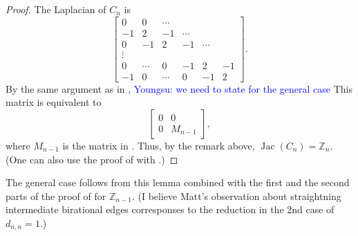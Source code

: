 \documentclass[11pt,reqno]{amsart}
\DeclareMathOperator{\Pic}{Pic}
\DeclareMathOperator{\Jac}{Jac}
\newcommand{\youngsu}[1]{{\textcolor{blue}{Youngsu: #1}}}
\theoremstyle{definition}
\newtheorem{myeg}[mydef]{Example}
\theoremstyle{plain}
\begin{document}
		\begin{proof}
			The Laplacian of $C_n$ is 
			\begin{equation}
			\begin{bmatrix}
				0 & 0 & \cdots \\
				-1 & 2 & -1 & \cdots \\
				0 & -1 & 2 & -1 & \cdots \\
				\vdots \\
				0 &  \cdots& 0 & -1 & 2 & -1 \\
				-1 &  0 & \cdots & 0 &  -1 & 2 
			\end{bmatrix}. 
			\end{equation}
			By the same argument as in , 
			\youngsu{we need to state \Cref{obj2} for the general case}
			This matrix is equivalent to 
			\begin{equation}
				\left[ \begin{array}{c|c}
					0 & 0 \\
					\hline 
					0 & M_{n-1}
				\end{array} \right],
			\end{equation}
			where $M_{n-1}$ is the matrix in .
			Thus, by the remark above, $\Jac (C_n) = \mathbb{Z}_n$. 
			(One can also use the proof of  with .)
		\end{proof}

		The general case follows from this lemma combined with the first and the second parts of the proof of  for $\mathbb{Z}_{n-1}$. (I believe Matt's observation about straightning intermediate birational edges corresponses to the reduction in the 2nd case of $d_{n,n}=1$.)


\end{document}
